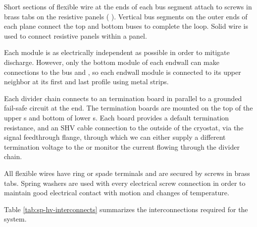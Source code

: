 Short sections of flexible wire at the ends of each  bus segment
attach to screws in brass tabs on the  resistive panels ( ).
Vertical  bus segments on the outer ends of each  plane connect
the top and bottom  buses to complete the loop.  Solid wire is used
to connect resistive panels within a  panel.

Each  module is as electrically independent as possible in order to
mitigate discharge.  However, only the bottom module of each endwall
can make connections to the  bus and , so each endwall module
is connected to its upper neighbor at its first and last profile
using metal strips.

Each  divider chain connects to an  termination board in parallel to a grounded fail-safe circuit at the  end.  The  termination boards are mounted on the top of the upper s and bottom of lower s.  Each board provides a default termination resistance, and an SHV cable connection to the outside of the cryostat, via the  signal feedthrough flange, through which we can either supply a different termination voltage to the  or monitor the current flowing through the divider chain.

All flexible wires have ring or spade terminals and are secured by
screws in brass tabs.  Spring washers are used with every electrical
screw connection in order to maintain good electrical contact with
motion and changes of temperature.

Table \ref{tab:sp-hv-interconnects} summarizes the interconnections required 
for the  system.

